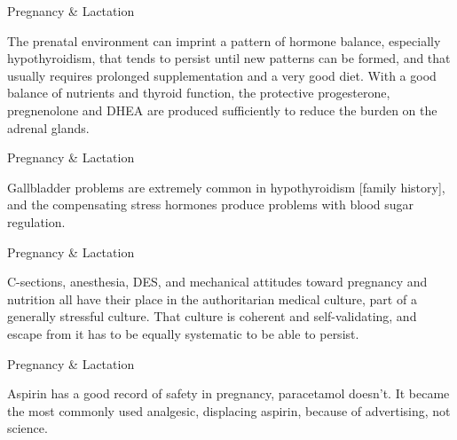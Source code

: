 \documentclass[11pt,oneside,openany,extrafontsizes]{memoir}
\begin{document}
\begin{standalonequote}{Pregnancy \& Lactation}

    \begin{answer}
        The prenatal environment can imprint a pattern of hormone balance, especially hypothyroidism, that tends to persist until new patterns can be formed, and that usually requires prolonged supplementation and a very good diet. With a good balance of nutrients and thyroid function, the protective progesterone, pregnenolone and DHEA are produced sufficiently to reduce the burden on the adrenal glands.
    \end{answer}
\end{standalonequote}

\begin{standalonequote}{Pregnancy \& Lactation}

    \begin{answer}
        Gallbladder problems are extremely common in hypothyroidism [family history], and the compensating stress hormones produce problems with blood sugar regulation.
    \end{answer}
\end{standalonequote}

\begin{standalonequote}{Pregnancy \& Lactation}

    \begin{answer}
        C-sections, anesthesia, DES, and mechanical attitudes toward pregnancy and nutrition all have their place in the authoritarian medical culture, part of a generally stressful culture. That culture is coherent and self-validating, and escape from it has to be equally systematic to be able to persist.
    \end{answer}
\end{standalonequote}

\begin{standalonequote}{Pregnancy \& Lactation}

    \begin{answer}
        Aspirin has a good record of safety in pregnancy, paracetamol doesn't. It became the most commonly used analgesic, displacing aspirin, because of advertising, not science.
    \end{answer}
\end{standalonequote}
\end{document}

